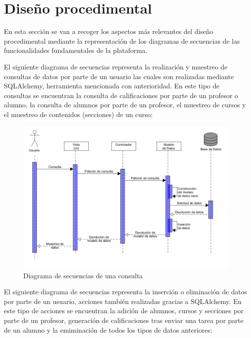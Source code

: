 \section{Diseño procedimental}
En esta sección se van a recoger los aspectos más relevantes del diseño procedimental mediante la representación de los diagramas de secuencias de las funcionalidades fundamentales de la plataforma.

El siguiente diagrama de secuencias representa la realización y muestreo de consultas de datos por parte de un usuario las cuales son realizadas mediante SQLAlchemy, herramienta mencionada con anterioridad. En este tipo de consultas se encuentran la consulta de calificaciones por parte de un profesor o alumno, la consulta de alumnos por parte de un profesor, el muestreo de cursos y el muestreo de contenidos (secciones) de un curso:

\begin{figure}[H]
    \centering
    \includegraphics[width=\textwidth]{img/imgs-memoria/Secuencias_Consulta.png}
    \caption{Diagrama de secuencias de una consulta}
\end{figure}

El siguiente diagrama de secuencias representa la inserción o eliminación de datos por parte de un usuario, acciones también realizadas gracias a SQLAlchemy. En este tipo de acciones se encuentran la adición de alumnos, cursos y secciones por parte de un profesor, generación de calificaciones tras enviar una tarea por parte de un alumno y la emiminación de todos los tipos de datos anteriores:


